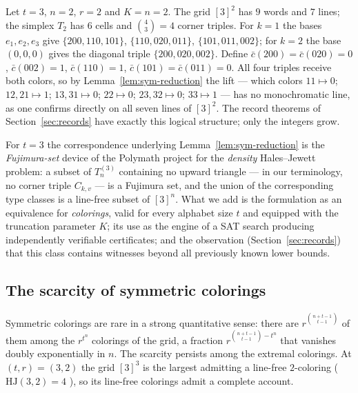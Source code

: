 \documentclass[12pt]{article}
\newcommand{\HJ}{\mathrm{HJ}}
\begin{document}
\begin{example}\label{ex:miniature}
Let $t=3$, $n=2$, $r=2$ and $K=n=2$. The grid $[3]^{2}$ has $9$ words
and $7$ lines; the simplex $T_{2}$ has $6$ cells and $\binom{4}{3}=4$
corner triples. For $k=1$ the bases $e_{1},e_{2},e_{3}$ give
$\{200,110,101\}$, $\{110,020,011\}$, $\{101,011,002\}$; for $k=2$ the
base $(0,0,0)$ gives the diagonal triple $\{200,020,002\}$. Define
$\bar c(200)=\bar c(020)=0$, $\bar c(002)=1$, $\bar c(110)=1$,
$\bar c(101)=\bar c(011)=0$. All four triples receive both colors, so by
Lemma~\ref{lem:sym-reduction} the lift --- which colors
$11\mapsto 0$; $12,21\mapsto 1$; $13,31\mapsto 0$; $22\mapsto 0$;
$23,32\mapsto 0$; $33\mapsto 1$ --- has no monochromatic line, as one
confirms directly on all seven lines of $[3]^{2}$. The record theorems
of Section~\ref{sec:records} have exactly this logical structure; only
the integers grow.
\end{example}

\begin{remark}\label{rem:polymath}
For $t=3$ the correspondence underlying
Lemma~\ref{lem:sym-reduction} is the \emph{Fujimura-set} device of the
Polymath project \cite{PolymathDHJMoser} for the \emph{density}
Hales--Jewett problem: a subset of $T_{n}^{(3)}$ containing no upward
triangle --- in our terminology, no corner triple $C_{k,v}$ --- is a
Fujimura set, and the union of the corresponding type classes is a
line-free subset of $[3]^{n}$. What we add is the formulation as an
equivalence for \emph{colorings}, valid for every alphabet size $t$ and
equipped with the truncation parameter $K$; its use as the engine of a
SAT search producing independently verifiable certificates; and the
observation (Section~\ref{sec:records}) that this class contains
witnesses beyond all previously known lower bounds.
\end{remark}

\subsection{The scarcity of symmetric colorings}\label{sec:scarcity}

Symmetric colorings are rare in a strong quantitative sense: there are
$r^{\binom{n+t-1}{t-1}}$ of them among the $r^{t^{n}}$ colorings of the
grid, a fraction $r^{\binom{n+t-1}{t-1}-t^{n}}$ that vanishes doubly
exponentially in $n$. The scarcity persists among the extremal
colorings. At $(t,r)=(3,2)$ the grid $[3]^{3}$ is the largest admitting
a line-free $2$-coloring ($\HJ(3,2)=4$
\cite{firstnontrivialHJ_is_4}), so its line-free colorings admit a
complete account.
\end{document}
